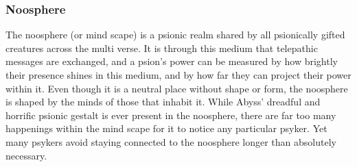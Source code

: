 \subsubsection{Noosphere}
\label{sec:Noosphere}

The noosphere (or mind scape) is a psionic realm shared by all psionically
gifted creatures across the multi verse. It is through this medium that
telepathic messages are exchanged, and a psion's power can be measured by
how brightly their presence shines in this medium, and by how far they
can project their power within it. Even though it is a neutral place without
shape or form, the noosphere is shaped by the minds of those that inhabit
it. While Abyss' dreadful and horrific psionic gestalt is ever present in
the noosphere, there are far too many happenings within the mind scape for
it to notice any particular psyker. Yet many psykers avoid staying connected
to the noosphere longer than absolutely necessary.